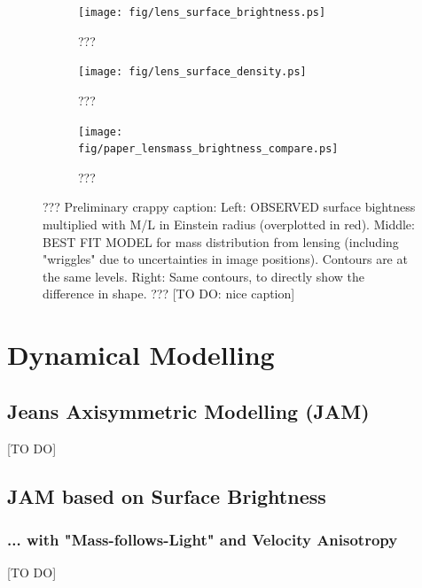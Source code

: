 \documentclass[useAMS,usenatbib]{mn2e}
\begin{document}
\begin{figure}
\centering
\begin{subfigure}{.3\textwidth}
  \centering
  \texttt{[image: fig/lens\_surface\_brightness.ps]}
  \caption{???}
  \label{fig:lenscomparelight}
\end{subfigure}%
\begin{subfigure}{.3\textwidth}
  \centering
  \texttt{[image: fig/lens\_surface\_density.ps]}
  \caption{???}
  \label{fig:lenscomparemass}
\end{subfigure}
\begin{subfigure}{.3\textwidth}
  \centering
  \texttt{[image: fig/paper\_lensmass\_brightness\_compare.ps]}
  \caption{???}
  \label{fig:lenscompareboth}
\end{subfigure}
\caption{??? Preliminary crappy caption: Left: OBSERVED surface bightness multiplied with M/L in Einstein radius (overplotted in red). Middle: BEST FIT MODEL for mass distribution from lensing (including "wriggles" due to uncertainties in image positions). Contours are at the same levels. Right: Same contours, to directly show the difference in shape. ??? [TO DO: nice caption]}
\label{fig:???}
\end{figure}

\clearpage

\section{Dynamical Modelling}

\subsection{Jeans Axisymmetric Modelling (JAM)}

[TO DO]

\subsection{JAM based on Surface Brightness}

\subsubsection{... with "Mass-follows-Light" and Velocity Anisotropy}

[TO DO]
\end{document}
